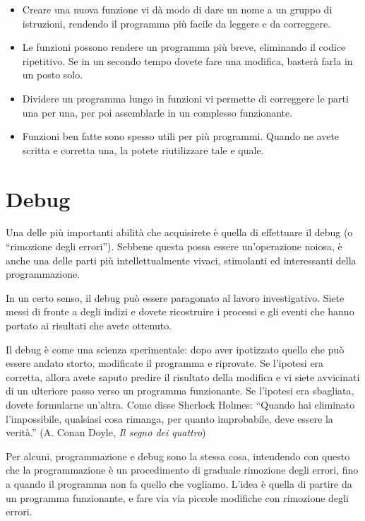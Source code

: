 \documentclass[10pt]{book}
\begin{document}
\begin{itemize}

\item Creare una nuova funzione vi dà modo di dare un nome a un gruppo di istruzioni, rendendo il programma più facile da leggere e da correggere.

\item Le funzioni possono rendere un programma più breve, eliminando il codice ripetitivo. Se in un secondo tempo dovete fare una modifica, basterà farla in un posto solo.

\item Dividere un programma lungo in funzioni vi permette di correggere le parti una per una, per poi assemblarle in un complesso funzionante.

\item Funzioni ben fatte sono spesso utili per più programmi. Quando ne avete scritta e corretta una, la potete riutilizzare tale e quale.

\end{itemize}


\section{Debug}
\label{editor}

Una delle più importanti abilità che acquisirete è quella di effettuare il debug (o ``rimozione degli errori''). Sebbene questa possa essere un'operazione noiosa, è anche una delle parti più intellettualmente vivaci, stimolanti ed interessanti della programmazione.

In un certo senso, il debug può essere paragonato al lavoro investigativo. Siete messi di fronte a degli indizi e dovete ricostruire i processi e gli eventi che hanno portato ai risultati che avete ottenuto.

Il debug è come una scienza sperimentale: dopo aver ipotizzato quello che può essere andato storto, modificate il programma e riprovate. Se l'ipotesi era corretta, allora avete saputo predire il risultato della modifica e vi siete avvicinati di un ulteriore passo verso un programma funzionante. Se l'ipotesi era sbagliata, dovete formularne un'altra. Come disse Sherlock Holmes: ``Quando hai eliminato l'impossibile, qualsiasi cosa rimanga, per quanto improbabile, deve essere la verità.''
(A. Conan Doyle, {\em Il segno dei quattro})

Per alcuni, programmazione e debug sono la stessa cosa, intendendo con questo che la programmazione è un procedimento di graduale rimozione degli errori, fino a quando il programma non fa quello che vogliamo. L'idea è quella di partire da un programma funzionante, e fare via via piccole modifiche con rimozione degli errori.
\end{document}
